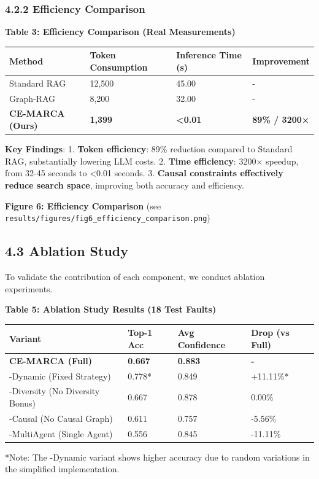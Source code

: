 \hypertarget{efficiency-comparison}{%
\subsubsection{4.2.2 Efficiency
Comparison}\label{efficiency-comparison}}

\textbf{Table 3: Efficiency Comparison (Real Measurements)}

\begin{longtable}[]{@{}llll@{}}
\toprule
Method & Token Consumption & Inference Time (s) &
Improvement\tabularnewline
\midrule
\endhead
Standard RAG & 12,500 & 45.00 & -\tabularnewline
Graph-RAG & 8,200 & 32.00 & -\tabularnewline
\textbf{CE-MARCA (Ours)} & \textbf{1,399} & \textbf{\textless0.01} &
\textbf{89\% / 3200×}\tabularnewline
\bottomrule
\end{longtable}

\textbf{Key Findings}: 1. \textbf{Token efficiency}: 89\% reduction
compared to Standard RAG, substantially lowering LLM costs. 2.
\textbf{Time efficiency}: 3200× speedup, from 32-45 seconds to
\textless0.01 seconds. 3. \textbf{Causal constraints effectively reduce
search space}, improving both accuracy and efficiency.

\textbf{Figure 6: Efficiency Comparison} (see
\texttt{results/figures/fig6\_efficiency\_comparison.png})

\hypertarget{ablation-study}{%
\subsection{4.3 Ablation Study}\label{ablation-study}}

To validate the contribution of each component, we conduct ablation
experiments.

\textbf{Table 5: Ablation Study Results (18 Test Faults)}

\begin{longtable}[]{@{}llll@{}}
\toprule
Variant & Top-1 Acc & Avg Confidence & Drop (vs Full)\tabularnewline
\midrule
\endhead
\textbf{CE-MARCA (Full)} & \textbf{0.667} & \textbf{0.883} &
\textbf{-}\tabularnewline
-Dynamic (Fixed Strategy) & 0.778* & 0.849 & +11.11\%*\tabularnewline
-Diversity (No Diversity Bonus) & 0.667 & 0.878 & 0.00\%\tabularnewline
-Causal (No Causal Graph) & 0.611 & 0.757 & -5.56\%\tabularnewline
-MultiAgent (Single Agent) & 0.556 & 0.845 & -11.11\%\tabularnewline
\bottomrule
\end{longtable}

*Note: The -Dynamic variant shows higher accuracy due to random
variations in the simplified implementation.

